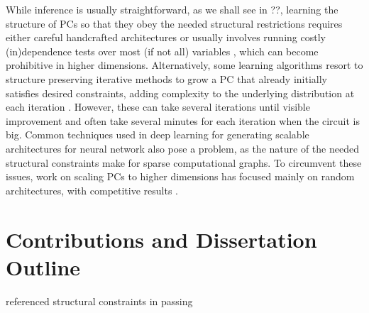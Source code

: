 While inference is usually straightforward, as we shall see in ??, learning the
structure of PCs so that they obey the needed structural restrictions requires either careful
handcrafted architectures \citep{poon11,cheng14,nath16} or usually involves running costly
(in)dependence tests over most (if not all) variables \citep{gens13,jaini18,vergari15,dimauro17a},
which can become prohibitive in higher dimensions. Alternatively, some learning algorithms resort
to structure preserving iterative methods to grow a PC that already initially satisfies desired
constraints, adding complexity to the underlying distribution at each iteration
\citep{liang17,dang20}. However, these can take several iterations until visible improvement and
often take several minutes for each iteration when the circuit is big. Common techniques used in
deep learning for generating scalable architectures for neural network also pose a problem, as the
nature of the needed structural constraints make for sparse computational graphs. To circumvent
these issues, work on scaling PCs to higher dimensions has focused mainly on random architectures,
with competitive results \citep{peharz20a,dimauro21,geh21a,peharz20b}.

\section{Contributions and Dissertation Outline}

referenced structural constraints in passing
